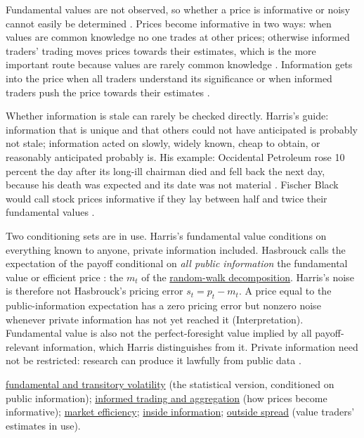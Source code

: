 \begin{qfdefinition}
 Fundamental values are not observed, so whether a price is informative or noisy cannot easily be determined \citep[same chap., p.~223]{alpha-harris}. Prices become informative in two ways: when values are common knowledge no one trades at other prices; otherwise informed traders' trading moves prices towards their estimates, which is the more important route because values are rarely common knowledge \citep[same chap., sec.~10.6.1, pp.~236--237]{alpha-harris}. Information gets into the price when all traders understand its significance or when informed traders push the price towards their estimates \citep[same chap., p.~229]{alpha-harris}.

 Whether information is stale can rarely be checked directly. Harris's guide: information that is unique and that others could not have anticipated is probably not stale; information acted on slowly, widely known, cheap to obtain, or reasonably anticipated probably is. His example: Occidental Petroleum rose 10 percent the day after its long-ill chairman died and fell back the next day, because his death was expected and its date was not material \citep[same chap., p.~229 and box, p.~230]{alpha-harris}. Fischer Black would call stock prices informative if they lay between half and twice their fundamental values \citep[same chap., box, p.~223]{alpha-harris}.

 Two conditioning sets are in use. Harris's fundamental value conditions on everything known to anyone, private information included. Hasbrouck calls the expectation of the payoff conditional on \emph{all public information} the fundamental value or efficient price \citep[sec.~3.2, p.~26]{s6-hasbrouck}: the $m_t$ of the \hyperref[def:volatility-components]{random-walk decomposition}. Harris's noise is therefore not Hasbrouck's pricing error $s_t=p_t-m_t$. A price equal to the public-information expectation has a zero pricing error but nonzero noise whenever private information has not yet reached it (Interpretation). Fundamental value is also not the perfect-foresight value implied by all payoff-relevant information, which Harris distinguishes from it. Private information need not be restricted: research can produce it lawfully from public data \citep[chap.~``Insider Trading'', p.~585]{alpha-harris}.

 \hyperref[def:volatility-components]{fundamental and transitory volatility} (the statistical version, conditioned on public information); \hyperref[res:informed-trading-aggregation]{informed trading and aggregation} (how prices become informative); \hyperref[def:market-efficiency]{market efficiency}; \hyperref[def:inside-information]{inside information}; \hyperref[def:outside-spread]{outside spread} (value traders' estimates in use).

\end{qfdefinition}

